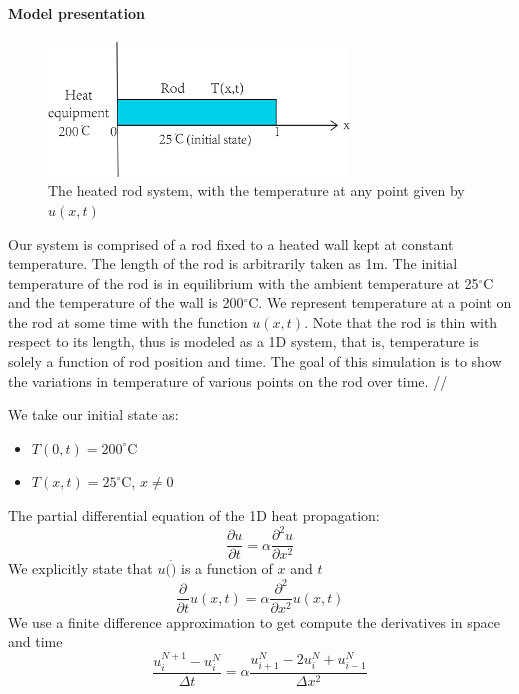 

\paragraph{Model presentation}

\begin{figure}[htb]
	\centering
	\includegraphics[width=8cm]{Figures/Heat1D_model.png}       
	\caption{The heated rod system, with the temperature at any point given by $u(x,t)$ }
	\label{Heat1D_model.fig}
\end{figure}

Our system is comprised of a rod fixed to a heated wall kept at constant temperature. The length of the rod is arbitrarily taken as 1m. The initial temperature of the rod is in equilibrium with the ambient temperature at 25$^{\circ} $C and the temperature of the wall is 200$^{\circ} $C.  We represent temperature at a point on the rod at some time with the function $u(x,t)$. Note that the rod is thin with respect to its length, thus is modeled as a 1D system, that is, temperature is solely a function of rod position and time. The goal of this simulation is to show the variations in temperature of various points on the rod over time. //

We take our initial state as:
\begin{itemize}
	\item $T(0,t)=200 ^{\circ}$C
    \item $T(x,t)=25 ^{\circ}$C, $x\ne 0$
\end{itemize}

\noindent The partial differential equation of the 1D heat propagation:
\begin{equation}
 \frac{\partial u}{\partial t} = \alpha \frac{\partial^2 u}{\partial x^2}
\end{equation}
\noindent We explicitly state that $u(\dot)$ is a function of $x$ and $t$
\begin{equation}
 \frac{\partial} {\partial t}u(x,t) = \alpha \frac{\partial^2}{\partial x^2}u(x,t)
\end{equation}
\noindent We use a finite difference approximation to get compute the derivatives in space and time
\begin{equation}
\frac{u_{i}^{N+1}-u_{i}^{N}}{\Delta t} =\alpha\frac{u_{i+1}^{N}-2u_{i}^{N}+u_{i-1}^{N}}{\Delta x^2}
\end{equation}

